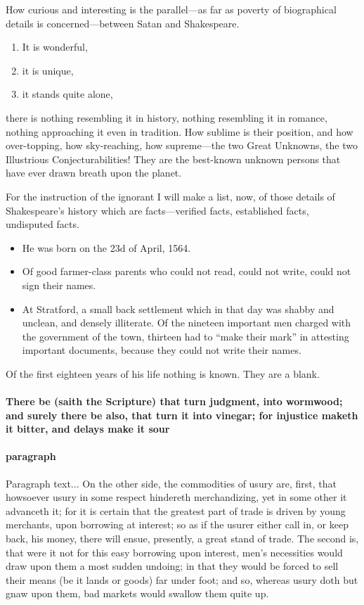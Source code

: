 \documentclass[a4paper, 12pt]{memoir}
\begin{document}
How curious and interesting is the parallel—as far as poverty of biographical details is concerned—between Satan and Shakespeare.
\begin{enumerate}
 \item   It is wonderful,
 \item   it is unique, 
 \item    it stands quite alone,
\end{enumerate}
 there is nothing resembling it in history, nothing resembling it in romance, nothing approaching it even in tradition.  How sublime is their position, and how over-topping, how sky-reaching, how supreme—the two Great Unknowns, the two Illustrious Conjecturabilities!  They are the best-known unknown persons that have ever drawn breath upon the planet.



For the instruction of the ignorant I will make a list, now, of those details of Shakespeare’s history which are facts—verified facts, established facts, undisputed facts.

\tightlists 

\begin{itemize}[•\textbullet ] 
\item He was born on the 23d of April, 1564.
\item  
Of good farmer-class parents who could not read, could not write, could not sign their names.
\item  At Stratford, a small back settlement which in that day was shabby and unclean, and densely illiterate.  Of the nineteen important men charged with the government of the town, thirteen had to “make their mark” in attesting important documents, because they could not write their names.
\end{itemize}



Of the first eighteen years of his life nothing is known.  They are a blank.


\paragraph*{ There be (saith the Scripture) that turn judgment, into wormwood; and surely there be also, that turn it into vinegar; for injustice maketh it bitter, and delays make it sour }
\paragraph*{paragraph} 
Paragraph text... On the other side, the commodities of usury are, first, that howsoever usury in some respect hindereth merchandizing, yet in some other it advanceth it; for it is certain that the greatest part of trade is driven by young merchants, upon borrowing at interest; so as if the usurer either call in, or keep back, his money, there will ensue, presently, a great stand of trade. The second is, that were it not for this easy borrowing upon interest, men's necessities would draw upon them a most sudden undoing; in that they would be forced to sell their means (be it lands or goods) far under foot; and so, whereas usury doth but gnaw upon them, bad markets would swallow them quite up.
\end{document}

